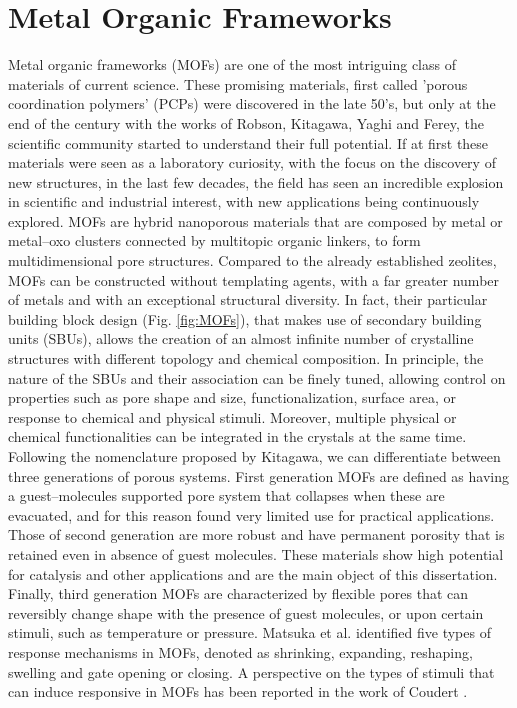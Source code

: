 \section{Metal Organic Frameworks}
Metal organic frameworks (MOFs) are one of the most intriguing class of materials of current science. These promising materials, first called 'porous coordination polymers' (PCPs) were discovered in the late 50's, but only at the end of the century with the works of Robson\cite{batten1995two,hoskins1990design}, Kitagawa\cite{kitagawa1991synthesis, kitagawa1993synthesis}, Yaghi\cite{yaghi1995hydrothermal} and Ferey\cite{riou1998hybrid}, the scientific community started to understand their full potential. If at first these materials were seen as a laboratory curiosity, with the focus on the discovery of new structures, in the last few decades, the field has seen an incredible explosion in scientific and industrial interest, with new applications being continuously explored\cite{furukawa2013chemistry}. MOFs are hybrid nanoporous materials that are composed by metal or metal--oxo clusters connected by multitopic organic linkers, to form multidimensional pore structures. Compared to the already established zeolites, MOFs can be constructed without templating agents, with a far greater number of metals and with an exceptional structural diversity. In fact, their particular building block design (Fig. \ref{fig:MOFs}), that makes use of secondary building units (SBUs), allows the creation of an almost infinite number of crystalline structures with different topology and chemical composition. In principle, the nature of the SBUs and their association can be finely tuned\cite{stock2011synthesis}, allowing control on properties such as pore shape and size, functionalization, surface area, or response to chemical and physical stimuli\cite{zhou2014metal,zhou2012introduction}. Moreover, multiple physical or chemical functionalities can be integrated in the crystals at the same time\cite{li2016applications}. 
\npar
Following the nomenclature proposed by Kitagawa, we can differentiate between three generations of porous systems\cite{kitagawa1998functional}. First generation MOFs are defined as having a guest--molecules supported pore system that collapses when these are evacuated, and for this reason found very limited use for practical applications. Those of second generation are more robust and have permanent porosity that is retained even in absence of guest molecules. These materials show high potential for catalysis and other applications and are the main object of this dissertation. Finally, third generation MOFs are characterized by flexible pores that can reversibly change shape with the presence of guest molecules, or upon certain stimuli, such as temperature or pressure. Matsuka et al.\cite{matsuda2004guest} identified five types of response mechanisms in MOFs, denoted as shrinking, expanding, reshaping, swelling and gate opening or closing. A perspective on the types of stimuli that can induce responsive in MOFs has been reported in the work of Coudert \cite{coudert2015responsive}.
